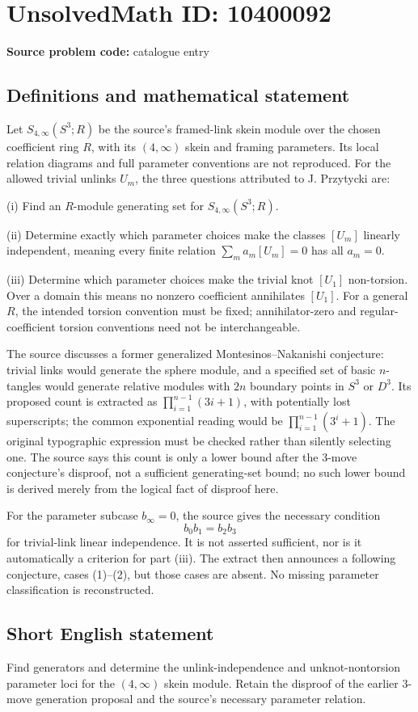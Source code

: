 \documentclass[11pt]{article}
\begin{document}
\section*{UnsolvedMath ID: 10400092}
\textbf{Source problem code:} catalogue entry
\subsection{Definitions and mathematical statement}
Let $S_{4,\infty}(S^3;R)$ be the source's framed-link skein module over the chosen coefficient ring $R$, with its $(4,\infty)$ skein and framing parameters. Its local relation diagrams and full parameter conventions are not reproduced. For the allowed trivial unlinks $U_m$, the three questions attributed to J. Przytycki are:

(i) Find an $R$-module generating set for $S_{4,\infty}(S^3;R)$.

(ii) Determine exactly which parameter choices make the classes $[U_m]$ linearly independent, meaning every finite relation $\sum_m a_m[U_m]=0$ has all $a_m=0$.

(iii) Determine which parameter choices make the trivial knot $[U_1]$ non-torsion. Over a domain this means no nonzero coefficient annihilates $[U_1]$. For a general $R$, the intended torsion convention must be fixed; annihilator-zero and regular-coefficient torsion conventions need not be interchangeable.

The source discusses a former generalized Montesinos--Nakanishi conjecture: trivial links would generate the sphere module, and a specified set of basic $n$-tangles would generate relative modules with $2n$ boundary points in $S^3$ or $D^3$. Its proposed count is extracted as $\prod_{i=1}^{n-1}(3i+1)$, with potentially lost superscripts; the common exponential reading would be $\prod_{i=1}^{n-1}(3^i+1)$. The original typographic expression must be checked rather than silently selecting one. The source says this count is only a lower bound after the 3-move conjecture's disproof, not a sufficient generating-set bound; no such lower bound is derived merely from the logical fact of disproof here.

For the parameter subcase $b_\infty=0$, the source gives the necessary condition
\[
b_0b_1=b_2b_3
\]
for trivial-link linear independence. It is not asserted sufficient, nor is it automatically a criterion for part (iii). The extract then announces a following conjecture, cases (1)--(2), but those cases are absent. No missing parameter classification is reconstructed.
\subsection{Short English statement}
Find generators and determine the unlink-independence and unknot-nontorsion parameter loci for the $(4,\infty)$ skein module. Retain the disproof of the earlier 3-move generation proposal and the source's necessary parameter relation.
\end{document}
